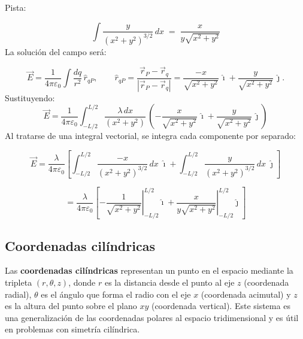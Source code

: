 \documentclass[a4paper,12pt]{article}
\begin{document}
\begin{center}
\end{center}

\noindent Pista: 

\[
\int \frac{y}{(x^2+y^2)^{3/2}}\,dx \;=\; \frac{x}{y\sqrt{x^2+y^2}}
\]
La solución del campo será:

\[
\vec E = \frac{1}{4\pi\varepsilon_0} \int \frac{dq}{r^2}\,\hat r_{qP},
\qquad
\hat r_{qP} = \frac{\vec r_P-\vec r_q}{|\vec r_P-\vec r_q|}
= \frac{-x}{\sqrt{x^2+y^2}}\,\hat{\imath} + \frac{y}{\sqrt{x^2+y^2}}\,\hat{\jmath}.
\]
Sustituyendo:
\[
\vec E = \frac{1}{4\pi\varepsilon_0} \int_{-L/2}^{L/2}
\frac{\lambda\,dx}{(x^2+y^2)}\,
\left( -\frac{x}{\sqrt{x^2+y^2}}\,\hat{\imath}
+ \frac{y}{\sqrt{x^2+y^2}}\,\hat{\jmath} \right)
\]
Al tratarse de una integral vectorial, se integra cada componente por separado:

\[
\vec E =
\frac{\lambda}{4\pi\varepsilon_0} \left[
\int_{-L/2}^{L/2} \frac{-x}{(x^2+y^2)^{3/2}}\,dx \;\hat{\imath}
+ \int_{-L/2}^{L/2} \frac{y}{(x^2+y^2)^{3/2}}\,dx \;\hat{\jmath}
\right]
\]

\[
= \frac{\lambda}{4\pi\varepsilon_0} \left[
\left. -\frac{1}{\sqrt{x^2+y^2}} \right|_{-L/2}^{L/2} \hat{\imath}
+ \left. \frac{x}{y\sqrt{x^2+y^2}} \right|_{-L/2}^{L/2} \hat{\jmath}
\right]
\]


\newpage
\subsection{Coordenadas cilíndricas}

\noindent Las \textbf{coordenadas cilíndricas} representan un punto en el espacio mediante la tripleta
 $(r,\theta,z)$, donde $r$ es la distancia desde el punto al eje $z$ (coordenada radial),
  $\theta$ es el ángulo que forma el radio con el eje $x$ (coordenada acimutal) y $z$ es la
   altura del punto sobre el plano $xy$ (coordenada vertical). Este sistema es una generalización
    de las coordenadas polares al espacio tridimensional y es útil en problemas con simetría cilíndrica.\\
\end{document}
